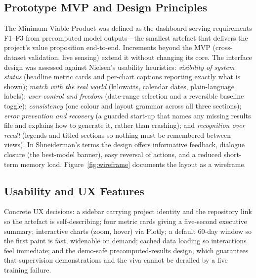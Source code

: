 \documentclass[11pt,a4paper]{article}
\begin{document}
\subsection{Prototype MVP and Design Principles}
The Minimum Viable Product was defined as the dashboard serving requirements
F1--F3 from precomputed model outputs---the smallest artefact that delivers the
project's value proposition end-to-end. Increments beyond the MVP (cross-dataset
validation, live sensing) extend it without changing its core. The interface
design was assessed against Nielsen's usability heuristics: \emph{visibility of
system status} (headline metric cards and per-chart captions reporting exactly
what is shown); \emph{match with the real world} (kilowatts, calendar dates,
plain-language labels); \emph{user control and freedom} (date-range selection
and a reversible baseline toggle); \emph{consistency} (one colour and layout
grammar across all three sections); \emph{error prevention and recovery} (a
guarded start-up that names any missing results file and explains how to
generate it, rather than crashing); and \emph{recognition over recall} (legends
and titled sections so nothing must be remembered between views). In
Shneiderman's terms the design offers informative feedback, dialogue closure
(the best-model banner), easy reversal of actions, and a reduced short-term
memory load. Figure~\ref{fig:wireframe} documents the layout as a wireframe.

\subsection{Usability and UX Features}
Concrete UX decisions: a sidebar carrying project identity and the repository
link so the artefact is self-describing; four metric cards giving a five-second
executive summary; interactive charts (zoom, hover) via Plotly; a default
60-day window so the first paint is fast, widenable on demand; cached data
loading so interactions feel immediate; and the demo-safe precomputed-results
design, which guarantees that supervision demonstrations and the viva cannot be
derailed by a live training failure.
\end{document}
